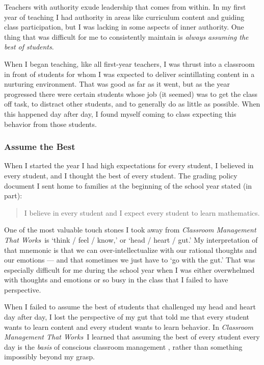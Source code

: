 \documentclass[11pt,twocolumn]{article}%
\def\cmtw{{\em Classroom Management That Works}}
\begin{document}
Teachers with authority exude leadership that comes from within. In
my first year of teaching I had authority in areas like curriculum
content and guiding class participation, but I was lacking in some
aspects of inner authority. One thing that was difficult for me to
consistently maintain is {\em always assuming the best of students}.

When I began teaching, like all first-year teachers, I was thrust
into a classroom in front of students for whom I was expected to
deliver scintillating content in a nurturing environment. That was
good as far as it went, but as the year progressed there were
certain students whose job (it seemed) was to get the class off
task, to distract other students, and to generally do as little as
possible. When this happened day after day, I found myself coming to
class expecting this behavior from those students.

\subsubsection{Assume the Best}
\label{Assume the Best}

When I started the year I had high expectations for every student, I
believed in every student, and I thought the best of every student.
The grading policy document I sent home to families at the beginning
of the school year stated (in part):

\begin{quote}\small
I believe in every student and I expect every student to learn
mathematics.
\end{quote}

One of the most valuable touch stones I took away from \cmtw\ is
`think / feel / know,' or `head / heart / gut.' My interpretation of
that mnemonic is that we can over-intellectualize with our rational
thoughts and our emotions --- and that sometimes we just have to `go
with the gut.' That was especially difficult for me during the
school year when I was either overwhelmed with thoughts and emotions
or so busy in the class that I failed to have perspective.

When I failed to assume the best of students that challenged my head
and heart day after day, I lost the perspective of my gut that told
me that every student wants to learn content and every student wants
to learn behavior. In \cmtw\ I learned that assuming the best of
every student every day is the {\em basis} of conscious classroom
management \cite{book:ccm}, rather than something impossibly beyond my
grasp.
\end{document}
